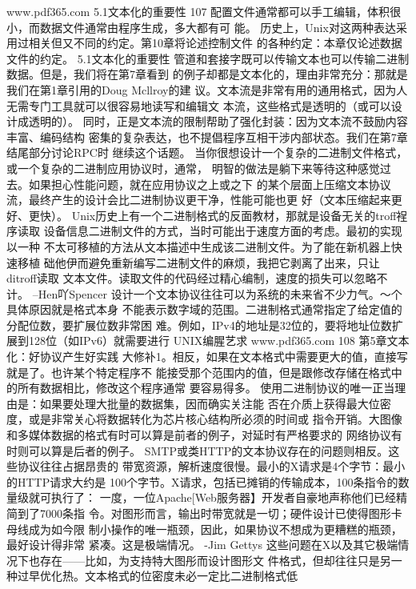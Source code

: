 \documentclass[11pt,oneside]{book}
\begin{document}
\begin{common-format}
www.pdf365.com
5.1文本化的重要性
107
配置文件通常都可以手工编辑，体积很小，而数据文件通常由程序生成，多大都有可
能。
    历史上，Unix对这两种表达采用过相关但又不同的约定。第10章将论述控制文件
的各种约定：本章仅论述数据文件的约定。
5.1文本化的重要性
    管道和套接字既可以传输文本也可以传输二进制数据。但是，我们将在第7章看到
的例子却都是文本化的，理由非常充分：那就是我们在第1章引用的Doug Mcllroy的建
议。文本流是非常有用的通用格式，因为人无需专门工具就可以很容易地读写和编辑文
本流，这些格式是透明的（或可以设计成透明的）。
    同时，正是文本流的限制帮助了强化封装：因为文本流不鼓励内容丰富、编码结构
密集的复杂表达，也不提倡程序互相干涉内部状态。我们在第7章结尾部分讨论RPC时
继续这个话题。
    当你很想设计一个复杂的二进制文件格式，或一个复杂的二进制应用协议时，通常，
明智的做法是躺下来等待这种感觉过去。如果担心性能问题，就在应用协议之上或之下
的某个层面上压缩文本协议流，最终产生的设计会比二进制协议更干净，性能可能也更
好（文本压缩起来更好、更快）。
    Unix历史上有一个二进制格式的反面教材，那就是设备无关的troff裎序读取
设备信息二进制文件的方式，当时可能出于速度方面的考虑。最初的实现以一种
不太可移植的方法从文本描述中生成该二进制文件。为了能在新机器上快速移植
础他伊而避免重新编写二进制文件的麻烦，我把它剥离了出来，只让ditroff读取
文本文件。读取文件的代码经过精心编制，速度的损失可以忽略不计。
    --Hen吖Spencer
    设计一个文本协议往往可以为系统的未来省不少力气。～个具体原因就是格式本身
不能表示数字域的范围。二进制格式通常指定了给定值的分配位数，要扩展位数非常困
难。例如，IPv4的地址是32位的，要将地址位数扩展到128位（如IPv6）就需要进行
UNIX编腥艺求
  www.pdf365.com
108
第5章文本化：好协议产生好实践
大修补1。相反，如果在文本格式中需要更大的值，直接写就是了。也许某个特定程序不
能接受那个范围内的值，但是跟修改存储在格式中的所有数据相比，修改这个程序通常
要容易得多。
    使用二进制协议的唯一正当理由是：如果要处理大批量的数据集，因而确实关注能
否在介质上获得最大位密度，或是非常关心将数据转化为芯片核心结构所必须的时间或
指令开销。大图像和多媒体数据的格式有时可以算是前者的例子，对延时有严格要求的
网络协议有时则可以算是后者的例子。
    SMTP或类HTTP的文本协议存在的问题则相反。这些协议往往占据昂贵的
带宽资源，解析速度很慢。最小的X请求是4个字节：最小的HTTP请求大约是
100个字节。X请求，包括已摊销的传输成本，100条指令的数量级就可执行了：
一度，一位Apache[Web服务器】开发者自豪地声称他们已经精简到了7000条指
令。对图形而言，输出时带宽就是一切；硬件设计已使得图形卡母线成为如今限
制小操作的唯一瓶颈，因此，如果协议不想成为更糟糕的瓶颈，最好设计得非常
紧凑。这是极端情况。
-Jim Gettys
    这些问题在X以及其它极端情况下也存在——比如，为支持特大图彤而设计图形文
件格式，但却往往只是另一种过早优化热。文本格式的位密度未必一定比二进制格式低

\end{common-format}
\end{document}
